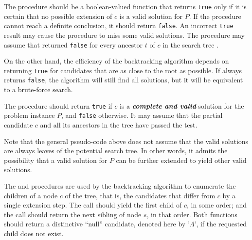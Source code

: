 

The  procedure should be a boolean-valued function that
returns \texttt{true} only if it is certain that no possible extension of
$c$ is a valid solution for $P$. If the procedure cannot reach a definite
conclusion, it should return \texttt{false}. An incorrect \texttt{true}
result may cause the  procedure to miss some valid solutions. The
procedure may assume that  returned \texttt{false} for
every ancestor $t$ of $c$ in the search tree .

On the other hand, the efficiency of the backtracking algorithm depends on
 returning \texttt{true} for candidates that are as close to the
root as possible. If  always returns \texttt{false}, the
algorithm will still find all solutions, but it will be equivalent to a
brute-force search.

The  procedure should return \texttt{true} if $c$ is a
\textbf{\emph{complete and valid}} solution for the problem instance $P$,
and \texttt{false} otherwise.  It may assume that the partial candidate $c$
and all its ancestors in the tree have passed the  test.

Note that the general pseudo-code above does not assume that the valid
solutions are always leaves of the potential search tree. In other words, it
admits the possibility that a valid solution for $P$ can be further extended
to yield other valid solutions.

The  and  procedures are used by the
backtracking algorithm to enumerate the children of a node $c$ of the tree,
that is, the candidates that differ from $c$ by a single extension step. The
call  should yield the first child of $c$, in some order;
and the call  should return the next sibling of node $s$, in
that order. Both functions should return a distinctive ``null'' candidate,
denoted here by '$\Lambda$', if the requested child does not exist.

